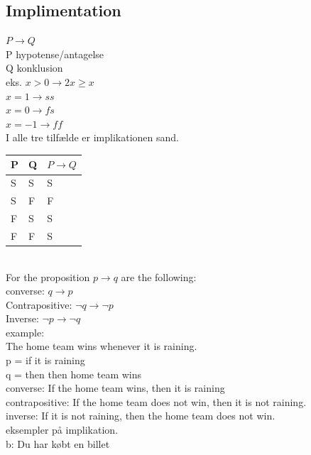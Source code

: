 \documentclass[12pt, a4paper]{article}
\begin{document}
			\subsection{Implimentation}
				$P\rightarrow Q$\\
				P hypotense/antagelse\\
				Q konklusion\\
				eks. $x>0 \rightarrow 2x \geq x$\\
				$x=1 \rightarrow s s$\\
				$x=0 \rightarrow f s$\\
				$x=-1 \rightarrow f f$\\
				I alle tre tilfælde er implikationen sand.\\
				\begin{table}[h!]
				\begin{tabular}{|l|l|l|}
				\hline
				P & Q & $P\rightarrow Q$ \\ \hline
				S & S & S                          \\ \hline
				S & F & F                          \\ \hline
				F & S & S                          \\ \hline
				F & F & S                          \\ \hline
				\end{tabular}
				\end{table}\\
				For the proposition $p\rightarrow q$ are the following:\\
					converse: $q\rightarrow p$\\
					Contrapositive: $\neg q \rightarrow \neg p$\\
					Inverse: $\neg p \rightarrow \neg q$\\
					example:\\
					The home team wins whenever it is raining.\\
					p = if it is raining\\
					q = then then home team wins\\
					converse: If the home team wins, then it is raining\\
					contrapositive: If the home team does not win, then it is not raining.\\
					inverse: If it is not raining, then the home team does not win.\\[5mm]
				eksempler på implikation.\\
					b: Du har købt en billet\\
\end{document}
